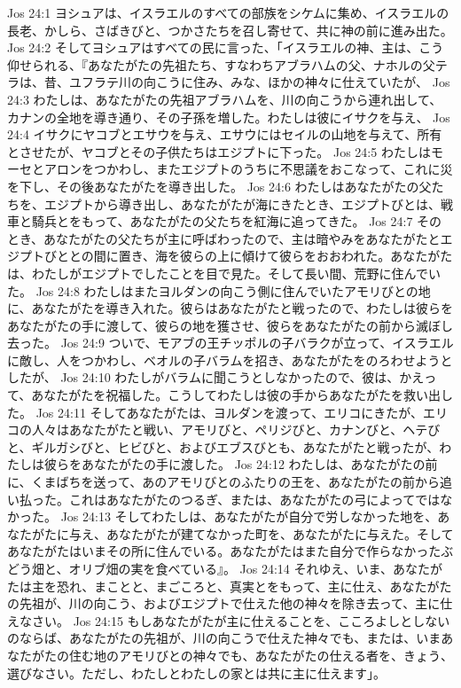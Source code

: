 Jos 24:1  ヨシュアは、イスラエルのすべての部族をシケムに集め、イスラエルの長老、かしら、さばきびと、つかさたちを召し寄せて、共に神の前に進み出た。
Jos 24:2  そしてヨシュアはすべての民に言った、「イスラエルの神、主は、こう仰せられる、『あなたがたの先祖たち、すなわちアブラハムの父、ナホルの父テラは、昔、ユフラテ川の向こうに住み、みな、ほかの神々に仕えていたが、
Jos 24:3  わたしは、あなたがたの先祖アブラハムを、川の向こうから連れ出して、カナンの全地を導き通り、その子孫を増した。わたしは彼にイサクを与え、
Jos 24:4  イサクにヤコブとエサウを与え、エサウにはセイルの山地を与えて、所有とさせたが、ヤコブとその子供たちはエジプトに下った。
Jos 24:5  わたしはモーセとアロンをつかわし、またエジプトのうちに不思議をおこなって、これに災を下し、その後あなたがたを導き出した。
Jos 24:6  わたしはあなたがたの父たちを、エジプトから導き出し、あなたがたが海にきたとき、エジプトびとは、戦車と騎兵とをもって、あなたがたの父たちを紅海に追ってきた。
Jos 24:7  そのとき、あなたがたの父たちが主に呼ばわったので、主は暗やみをあなたがたとエジプトびととの間に置き、海を彼らの上に傾けて彼らをおおわれた。あなたがたは、わたしがエジプトでしたことを目で見た。そして長い間、荒野に住んでいた。
Jos 24:8  わたしはまたヨルダンの向こう側に住んでいたアモリびとの地に、あなたがたを導き入れた。彼らはあなたがたと戦ったので、わたしは彼らをあなたがたの手に渡して、彼らの地を獲させ、彼らをあなたがたの前から滅ぼし去った。
Jos 24:9  ついで、モアブの王チッポルの子バラクが立って、イスラエルに敵し、人をつかわし、ベオルの子バラムを招き、あなたがたをのろわせようとしたが、
Jos 24:10  わたしがバラムに聞こうとしなかったので、彼は、かえって、あなたがたを祝福した。こうしてわたしは彼の手からあなたがたを救い出した。
Jos 24:11  そしてあなたがたは、ヨルダンを渡って、エリコにきたが、エリコの人々はあなたがたと戦い、アモリびと、ペリジびと、カナンびと、ヘテびと、ギルガシびと、ヒビびと、およびエブスびとも、あなたがたと戦ったが、わたしは彼らをあなたがたの手に渡した。
Jos 24:12  わたしは、あなたがたの前に、くまばちを送って、あのアモリびとのふたりの王を、あなたがたの前から追い払った。これはあなたがたのつるぎ、または、あなたがたの弓によってではなかった。
Jos 24:13  そしてわたしは、あなたがたが自分で労しなかった地を、あなたがたに与え、あなたがたが建てなかった町を、あなたがたに与えた。そしてあなたがたはいまその所に住んでいる。あなたがたはまた自分で作らなかったぶどう畑と、オリブ畑の実を食べている』。
Jos 24:14  それゆえ、いま、あなたがたは主を恐れ、まことと、まごころと、真実とをもって、主に仕え、あなたがたの先祖が、川の向こう、およびエジプトで仕えた他の神々を除き去って、主に仕えなさい。
Jos 24:15  もしあなたがたが主に仕えることを、こころよしとしないのならば、あなたがたの先祖が、川の向こうで仕えた神々でも、または、いまあなたがたの住む地のアモリびとの神々でも、あなたがたの仕える者を、きょう、選びなさい。ただし、わたしとわたしの家とは共に主に仕えます」。
